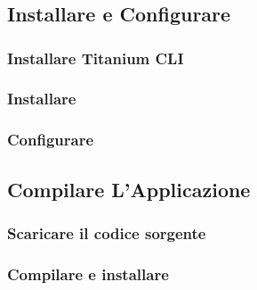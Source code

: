 \section{\tisdk{}}

    \subsection{Installare e Configurare \tisdk{}}
        \subsubsection{Installare Titanium CLI}
        \subsubsection{Installare \tisdk{}}
        \subsubsection{Configurare \tisdk{}}
        
    \subsection{Compilare L'Applicazione}
        \subsubsection{Scaricare il codice sorgente}
        \subsubsection{Compilare e installare}
